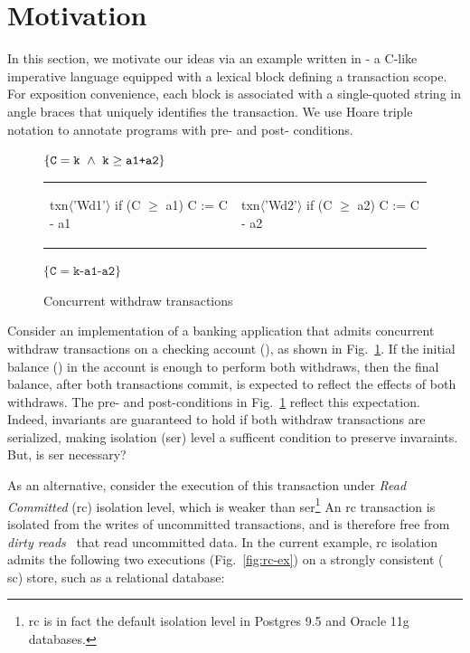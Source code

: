 \section{Motivation}
\label{sec:motivation}

In this section, we motivate our ideas via an example written in
\txnimp - a C-like imperative language equipped with a  lexical
block defining a transaction scope.  For exposition convenience, each
 block is associated with a single-quoted string in angle
braces that uniquely identifies the transaction. We use Hoare triple
notation to annotate programs with pre- and post- conditions.

\begin{figure}
\centering
$\{\texttt{C}=\texttt{k} ~\wedge~ \texttt{k}\ge\texttt{a1+a2}\}$
\begin{tabular}{l||l}
\begin{txnimpcode}
  txn$\langle$'Wd1'$\rangle${
    if (C $\ge$ a1) {
      C := C - a1
    }
  }
\end{txnimpcode}
&
\begin{txnimpcode}
  txn$\langle$'Wd2'$\rangle${
    if (C $\ge$ a2) {
      C := C - a2
    }
  }
\end{txnimpcode}
\\
\end{tabular}
$\{\texttt{C}=\texttt{k-a1-a2}\}$
\caption{\small Concurrent withdraw transactions}
\label{fig:motiv-eg-1}
\vspace*{-10pt}
\end{figure}

Consider an implementation of a banking application that admits
concurrent withdraw transactions on a checking account (), as
shown in Fig.~\ref{fig:motiv-eg-1}. If the initial balance () in
the account is enough to perform both withdraws, then the final
balance, after both transactions commit, is expected to reflect the
effects of both withdraws. The pre- and post-conditions in
Fig.~\ref{fig:motiv-eg-1} reflect this expectation. Indeed, invariants
are guaranteed to hold if both withdraw transactions are serialized,
making  isolation ({\sc ser}) level a sufficent
condition to preserve invaraints. But, is {\sc ser} necessary?

As an alternative, consider the execution of this transaction under
\emph{Read Committed} ({\sc rc}) isolation level, which is weaker than
{\sc ser}\footnote{{\sc rc} is in fact the default isolation level in
Postgres 9.5 and Oracle 11g databases.} An {\sc rc} transaction is
isolated from the writes of uncommitted transactions, and is therefore
free from \emph{dirty reads}~\cite{berenson} that read uncommitted
data. In the current example, {\sc rc} isolation admits the following
two executions (Fig.~\ref{fig:rc-ex}) on a strongly consistent ({\sc
sc}) store, such as a relational database:

